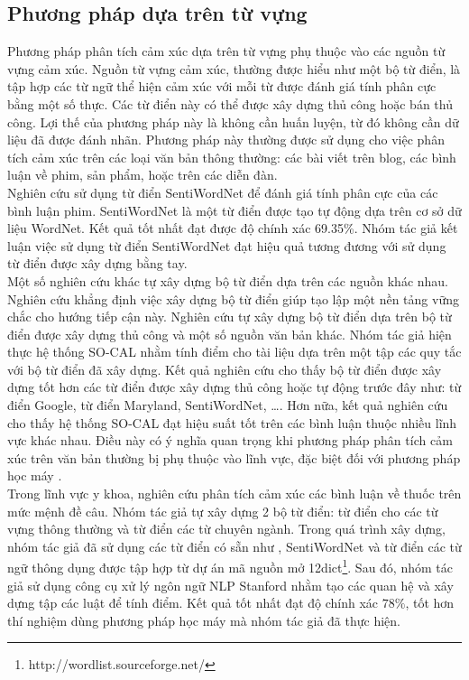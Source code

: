 \subsection{Phương pháp dựa trên từ vựng}
Phương pháp phân tích cảm xúc dựa trên từ vựng phụ thuộc vào các nguồn từ vựng cảm xúc. Nguồn từ vựng cảm xúc, thường được hiểu như một bộ từ điển, là tập hợp các từ ngữ thể hiện cảm xúc với mỗi từ được đánh giá tính phân cực bằng một số thực. Các từ điển này có thể được xây dựng thủ công hoặc bán thủ công. Lợi thế của phương pháp này là không cần huấn luyện, từ đó không cần dữ liệu đã được đánh nhãn. Phương pháp này thường được sử dụng cho việc phân tích cảm xúc trên các loại văn bản thông thường: các bài viết trên blog, các bình luận về phim, sản phẩm, hoặc trên các diễn đàn. \\

Nghiên cứu \cite{ohana2009sentiment} sử dụng từ điển SentiWordNet để đánh giá tính phân cực của các bình luận phim. SentiWordNet là một từ điển được tạo tự động dựa trên cơ sở dữ liệu WordNet. Kết quả tốt nhất đạt được độ chính xác 69.35\%. Nhóm tác giả kết luận việc sử dụng từ điển SentiWordNet đạt hiệu quả tương đương với sử dụng từ điển được xây dựng bằng tay.\\

Một số nghiên cứu khác tự xây dựng bộ từ điển dựa trên các nguồn khác nhau. Nghiên cứu \cite{taboada2011lexicon} khẳng định việc xây dựng bộ từ điển giúp tạo lập một nền tảng vững chắc cho hướng tiếp cận này. Nghiên cứu tự xây dựng bộ từ điển dựa trên bộ từ điển được xây dựng thủ công  và một số nguồn văn bản khác. Nhóm tác giả hiện thực hệ thống SO-CAL nhằm tính điểm cho tài liệu dựa trên một tập các quy tắc với bộ từ điển đã xây dựng. Kết quả nghiên cứu cho thấy bộ từ điển được xây dựng tốt hơn các từ điển được xây dựng thủ công hoặc tự động trước đây như: từ điển Google, từ điển Maryland, SentiWordNet, \ldots. Hơn nữa, kết quả nghiên cứu cho thấy hệ thống SO-CAL đạt hiệu suất tốt trên các bình luận thuộc nhiều lĩnh vực khác nhau. Điều này có ý nghĩa quan trọng khi phương pháp phân tích cảm xúc trên văn bản thường bị phụ thuộc vào lĩnh vực, đặc biệt đối với phương pháp học máy \cite{Giachanou2016}.\\

Trong lĩnh vực y khoa, nghiên cứu \cite{na2012sentiment} phân tích cảm xúc các bình luận về thuốc trên mức mệnh đề câu. Nhóm tác giả tự xây dựng 2 bộ từ điển: từ điển cho các từ vựng thông thường và từ điển các từ chuyên ngành. Trong quá trình xây dựng, nhóm tác giả đã sử dụng các từ điển có sẵn như , SentiWordNet và từ điển các từ ngữ thông dụng được tập hợp từ dự án mã nguồn mở 12dict\footnote{http://wordlist.sourceforge.net/}. Sau đó, nhóm tác giả sử dụng công cụ xử lý ngôn ngữ NLP Stanford nhằm tạo các quan hệ và xây dựng tập các luật để tính điểm. Kết quả tốt nhất đạt độ chính xác $78\%$, tốt hơn thí nghiệm dùng phương pháp học máy mà nhóm tác giả đã thực hiện.
